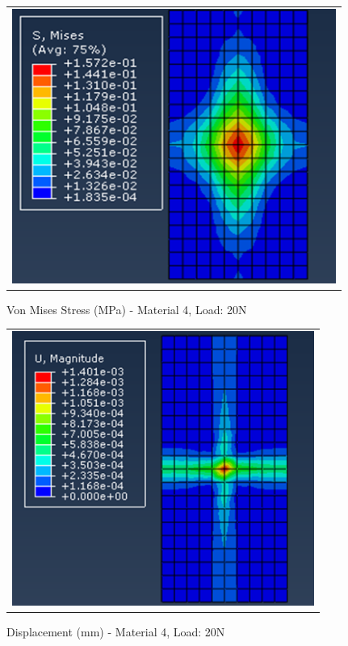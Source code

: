 \documentclass[a4paper,12pt]{article}
\numberwithin{equation}{section}
\numberwithin{figure}{section}
\begin{document}
\begin{figure}[H]
  \centering
  \begin{tabular}{@{}c@{}}
    \includegraphics[width=0.7\linewidth,height=255pt]{Results/Point Loading/M4_VMS_L4.png} \\
  \end{tabular}
  \caption{Von Mises Stress (MPa) - Material 4, Load: 20N}
\end{figure}

\begin{figure}[H]
  \centering
  \begin{tabular}{@{}c@{}}
    \includegraphics[width=0.7\linewidth,height=255pt]{Results/Point Loading/M4_DIS_L4.png} \\
  \end{tabular}
  \caption{Displacement (mm) - Material 4, Load: 20N}
\end{figure}
\end{document}

